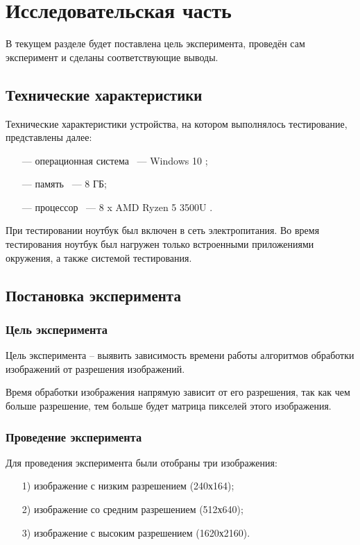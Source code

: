 \section{Исследовательская часть}

В текущем разделе будет поставлена цель эксперимента, проведён сам
эксперимент и сделаны соответствующие выводы.

\subsection{Технические характеристики}

Технические характеристики устройства, на котором выполнялось тестирование, представлены далее:

\begin{itemize}[leftmargin=1.6\parindent]
	\item[---] операционная система ~--- Windows 10 \cite{windows};
	\item[---] память ~--- 8 ГБ;
	\item[---] процессор ~--- 8 x AMD Ryzen 5 3500U \cite{amd}.
\end{itemize}

При тестировании ноутбук был включен в сеть электропитания. Во время тестирования ноутбук был нагружен только встроенными приложениями окружения, а также системой тестирования.

\subsection{Постановка эксперимента}

\subsubsection{Цель эксперимента}

Цель эксперимента -- выявить зависимость времени работы алгоритмов обработки изображений от разрешения изображений.

Время обработки изображения напрямую зависит от его разрешения, так как чем больше разрешение, тем больше будет матрица пикселей этого изображения.

\subsubsection{Проведение эксперимента}

Для проведения эксперимента были отобраны три изображения:

\begin{itemize}[leftmargin=1.6\parindent]
	\item[1)] изображение с низким разрешением (240х164);
	\item[2)] изображение со средним разрешением (512х640);
	\item[3)] изображение с высоким разрешением (1620х2160).
\end{itemize}

